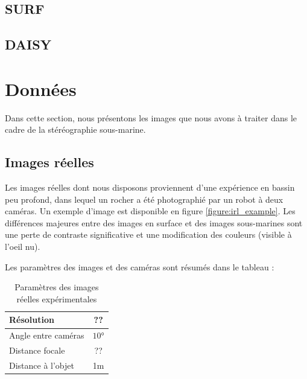 \documentclass[
	a4paper, %
	10pt, %
	unnumberedsections, %
	twoside, %
]{LTJournalArticle}
\begin{document}

\subsection{SURF}

\subsection{DAISY}

\section{Données}

Dans cette section, nous présentons les images que nous avons à traiter dans le cadre de la stéréographie sous-marine.

\subsection{Images réelles}

Les images réelles dont nous disposons proviennent d'une expérience en bassin peu profond, dans lequel un rocher a été photographié par un robot à deux caméras. Un exemple d'image est disponible en figure \ref{figure:irl_example}.
Les différences majeures entre des images en surface et des images sous-marines sont une perte de contraste significative et une modification des couleurs (visible à l'oeil nu).


Les paramètres des images et des caméras sont résumés dans le tableau  :

\begin{table}[t]
	\begin{adjustbox}{width=\columnwidth, left}
		\begin{tabular}{l c}
			\hline
			Résolution          & ??    \\
			\hline
			Angle entre caméras & $10$° \\
			Distance focale     & ??    \\
			Distance à l'objet  & 1m    \\
			\hline
		\end{tabular}
	\end{adjustbox}
	\label{table:params_irl_imgs}
	\caption{Paramètres des images réelles expérimentales}
\end{table}
\end{document}
